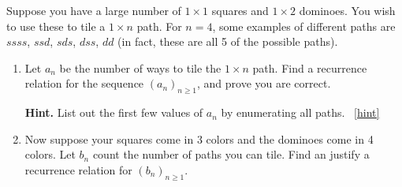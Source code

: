 \documentclass{book}
\begin{document}
\setcounter{project}{139}
\addtocounter{project}{-1}
\begin{activity}[]\label{act-dominoes}
\hypertarget{p-948}{}%
Suppose you have a large number of \(1\times 1\) squares and \(1 \times 2\) dominoes.  You wish to use these to tile a \(1 \times n\) path.  For \(n = 4\), some examples of different paths are \(ssss\), \(ssd\), \(sds\), \(dss\), \(dd\) (in fact, these are all 5 of the possible paths).%
\begin{enumerate}[font=\bfseries,label=(\alph*),ref=\alph*]
\item\label{task-174} \hypertarget{p-949}{}%
Let \(a_n\) be the number of ways to tile the \(1 \times n\) path.  Find a recurrence relation for the sequence \((a_n)_{n \ge 1}\), and prove you are correct.%
\par\smallskip%
\noindent\textbf{Hint.}\hypertarget{hint-98}{}\quad%
\hypertarget{p-950}{}%
List out the first few values of \(a_n\) by enumerating all paths.%
~\hfill{\tiny\hyperlink{a-139.a}{[hint]}\hypertarget{q-139.a}{}}\item\label{task-175} \hypertarget{p-951}{}%
Now suppose your squares come in 3 colors and the dominoes come in 4 colors.  Let \(b_n\) count the number of paths you can tile.  Find an justify a recurrence relation for \((b_n)_{n \ge 1}\).%
\end{enumerate}
\end{activity}
\end{document}
